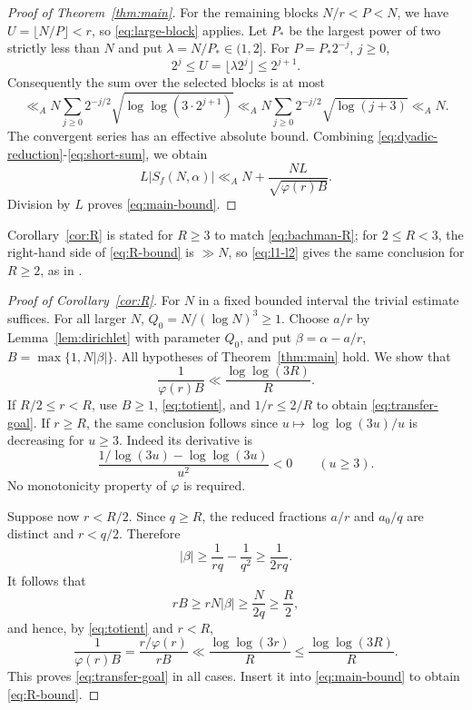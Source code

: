 \documentclass[11pt]{amsart}
\numberwithin{equation}{section}
\numberwithin{figure}{section}
\theoremstyle{definition}
\begin{document}
\begin{proof}[Proof of Theorem~\ref{thm:main}]
For the remaining blocks $N/r<P<N$, we have $U=\lfloor N/P\rfloor<r$,
so \eqref{eq:large-block} applies. Let $P_*$ be the largest power of
two strictly less than $N$ and put $\lambda=N/P_*\in(1,2]$.
For $P=P_*2^{-j}$, $j\ge0$,
\[
 2^j\le U=\lfloor\lambda2^j\rfloor\le2^{j+1}.
\]
Consequently the sum over the selected blocks is at most
\begin{equation}\label{eq:short-sum}
 \ll_A N\sum_{j\ge0}2^{-j/2}
           \sqrt{\log\log(3\cdot2^{j+1})}
 \ll_A N\sum_{j\ge0}2^{-j/2}\sqrt{\log(j+3)}
 \ll_A N.
\end{equation}
The convergent series has an effective absolute bound.
Combining \eqref{eq:dyadic-reduction}-\eqref{eq:short-sum}, we obtain
\[
 L|S_f(N,\alpha)|\ll_A
 N+\frac{NL}{\sqrt{\varphi(r)B}}.
\]
Division by $L$ proves \eqref{eq:main-bound}.
\end{proof}

Corollary~\ref{cor:R} is stated for $R\ge3$ to match
\eqref{eq:bachman-R}; for $2\le R<3$, the right-hand side of
\eqref{eq:R-bound} is $\gg N$, so \eqref{eq:l1-l2} gives the same
conclusion for $R\ge2$, as in \cite[Corollary~1]{MV}.

\begin{proof}[Proof of Corollary~\ref{cor:R}]
For $N$ in a fixed bounded interval the trivial estimate suffices.
For all larger $N$, $Q_0=N/(\log N)^3\ge1$.
Choose $a/r$ by Lemma~\ref{lem:dirichlet} with parameter $Q_0$, and put
$\beta=\alpha-a/r$, $B=\max\{1,N|\beta|\}$.
All hypotheses of Theorem~\ref{thm:main} hold.
We show that
\begin{equation}\label{eq:transfer-goal}
 \frac1{\varphi(r)B}\ll\frac{\log\log(3R)}R.
\end{equation}
If $R/2\le r<R$, use $B\ge1$, \eqref{eq:totient}, and
$1/r\le2/R$ to obtain \eqref{eq:transfer-goal}.
If $r\ge R$, the same conclusion follows since
$u\mapsto\log\log(3u)/u$ is decreasing for $u\ge3$.
Indeed its derivative is
\[
 \frac{1/\log(3u)-\log\log(3u)}{u^2}<0\qquad(u\ge3).
\]
No monotonicity property of $\varphi$ is required.

Suppose now $r<R/2$. Since $q\ge R$, the reduced fractions $a/r$ and
$a_0/q$ are distinct and $r<q/2$. Therefore
\[
 |\beta|\ge\frac1{rq}-\frac1{q^2}\ge\frac1{2rq}.
\]
It follows that
\[
 rB\ge rN|\beta|\ge\frac N{2q}\ge\frac R2,
\]
and hence, by \eqref{eq:totient} and $r<R$,
\[
 \frac1{\varphi(r)B}
 =\frac{r/\varphi(r)}{rB}
 \ll\frac{\log\log(3r)}R
 \le\frac{\log\log(3R)}R.
\]
This proves \eqref{eq:transfer-goal} in all cases.
Insert it into \eqref{eq:main-bound} to obtain \eqref{eq:R-bound}.
\end{proof}
\end{document}
